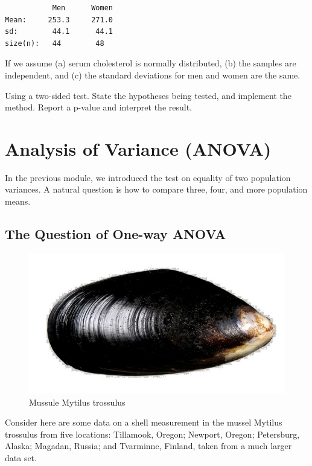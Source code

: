 \documentclass[
]{book}
\begin{document}
\begin{verbatim}
           Men      Women
Mean:     253.3     271.0
sd:        44.1      44.1
size(n):   44        48
\end{verbatim}

If we assume (a) serum cholesterol is normally distributed, (b) the samples are independent, and (c) the standard deviations for men and women are the same.

Using a two-sided test. State the hypotheses being tested, and implement the method. Report a p-value and interpret the result.

\hypertarget{analysis-of-variance-anova}{%
\chapter{Analysis of Variance (ANOVA)}\label{analysis-of-variance-anova}}

In the previous module, we introduced the test on equality of two population variances. A natural question is how to compare three, four, and more population means.

\hypertarget{the-question-of-one-way-anova}{%
\section{The Question of One-way ANOVA}\label{the-question-of-one-way-anova}}

\begin{figure}

{\centering \includegraphics[width=0.8\linewidth]{img08/w08-mytilus_edulis} 

}

\caption{ Mussule Mytilus trossulus}\label{fig:unnamed-chunk-126}
\end{figure}

Consider here are some data on a shell measurement in the mussel Mytilus trossulus from five locations: Tillamook, Oregon; Newport, Oregon; Petersburg, Alaska; Magadan, Russia; and Tvarminne, Finland, taken from a much larger data set.
\end{document}
